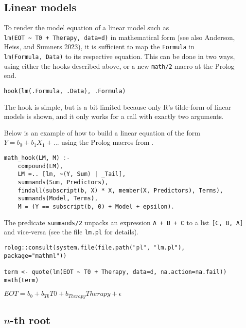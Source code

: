 \hypertarget{linear-models}{%
\subsection{Linear models}\label{linear-models}}

To render the model equation of a linear model such
as \texttt{lm(EOT\ \textasciitilde{}\ T0\ +\ Therapy,\ data=d)} in mathematical
form (see also Anderson, Heiss, and Sumners 2023), it is sufficient to map the \texttt{Formula}
in \texttt{lm(Formula,\ Data)} to its respective equation. This can be done in two ways,
using either the hooks described above, or a new \texttt{math/2} macro at the Prolog
end.

\begin{verbatim}
hook(lm(.Formula, .Data), .Formula)
\end{verbatim}

The hook is simple, but is a bit limited because only R's tilde-form
of linear models is shown, and it only works for a call with exactly two
arguments.

Below is an example of how to build a linear equation of the
form \(Y = b_0 + b_1X_1 + ...\) using the Prolog macros from .

\begin{verbatim}
math_hook(LM, M) :-
    compound(LM),
    LM =.. [lm, ~(Y, Sum) | _Tail],
    summands(Sum, Predictors),
    findall(subscript(b, X) * X, member(X, Predictors), Terms),
    summands(Model, Terms),
    M = (Y == subscript(b, 0) + Model + epsilon).
\end{verbatim}

The predicate \texttt{summands/2} unpacks an expression \texttt{A\ +\ B\ +\ C} to a
list \texttt{{[}C,\ B,\ A{]}} and vice-versa (see the file \texttt{lm.pl} for details).

\begin{verbatim}
rolog::consult(system.file(file.path("pl", "lm.pl"), package="mathml"))

term <- quote(lm(EOT ~ T0 + Therapy, data=d, na.action=na.fail))
math(term)
\end{verbatim}

\({EOT}{=}{{{{b}_{0}}{+}{{{{b}_{T0}}{{}}{T0}}{+}{{{b}_{Therapy}}{{}}{Therapy}}}}{+}{\epsilon}}\)

\hypertarget{n-th-root}{%
\subsection{\texorpdfstring{\(n\)-th root}{n-th root}}\label{n-th-root}}

